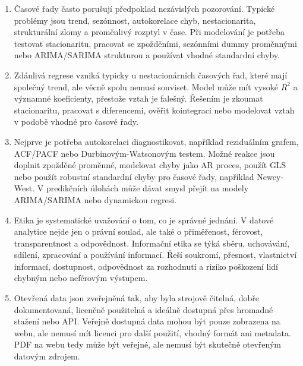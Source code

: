 \documentclass[12pt,a4paper]{article}
\begin{document}
\begin{enumerate}
  \item {}

  Časové řady často porušují předpoklad nezávislých pozorování. Typické problémy jsou trend,
  sezónnost, autokorelace chyb, nestacionarita, strukturální zlomy a proměnlivý rozptyl v čase.
  Při modelování je potřeba testovat stacionaritu, pracovat se zpožděními, sezónními dummy proměnnými
  nebo ARIMA/SARIMA strukturou a používat vhodné standardní chyby.

  \item {}

  Zdánlivá regrese vzniká typicky u nestacionárních časových řad, které mají společný trend, ale
  věcně spolu nemusí souviset. Model může mít vysoké $R^2$ a významné koeficienty, přestože vztah je
  falešný. Řešením je zkoumat stacionaritu, pracovat s diferencemi, ověřit kointegraci nebo modelovat
  vztah v podobě vhodné pro časové řady.

  \item {}

  Nejprve je potřeba autokorelaci diagnostikovat, například reziduálním grafem, ACF/PACF nebo
  Durbinovým-Watsonovým testem. Možné reakce jsou doplnit zpožděné proměnné, modelovat chyby jako
  AR proces, použít GLS nebo použít robustní standardní chyby pro časové řady, například Newey-West.
  V predikčních úlohách může dávat smysl přejít na modely ARIMA/SARIMA nebo dynamickou regresi.

  \item {}

  Etika je systematické uvažování o tom, co je správné jednání. V datové analytice nejde jen o právní
  soulad, ale také o přiměřenost, férovost, transparentnost a odpovědnost. Informační etika se týká
  sběru, uchovávání, sdílení, zpracování a používání informací. Řeší soukromí, přesnost, vlastnictví
  informací, dostupnost, odpovědnost za rozhodnutí a riziko poškození lidí chybným nebo neférovým
  výstupem.

  \item {}

  Otevřená data jsou zveřejněná tak, aby byla strojově čitelná, dobře dokumentovaná, licenčně
  použitelná a ideálně dostupná přes hromadné stažení nebo API. Veřejně dostupná data mohou být
  pouze zobrazena na webu, ale nemusí mít licenci pro další použití, vhodný formát ani metadata.
  PDF na webu tedy může být veřejné, ale nemusí být skutečně otevřeným datovým zdrojem.


\end{enumerate}
\end{document}

